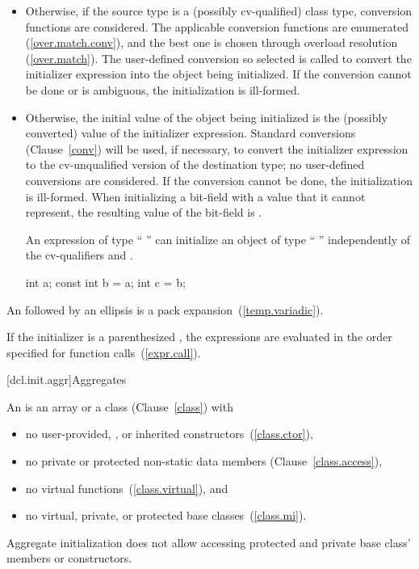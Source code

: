 \begin{itemize}
\item
Otherwise, if the source type
is a (possibly cv-qualified) class type, conversion functions are
considered.
The applicable conversion functions are enumerated
(\ref{over.match.conv}), and the best one is chosen through overload
resolution (\ref{over.match}).
The user-defined conversion so selected
is called to convert the initializer expression into the
object being initialized.
If the conversion cannot be done or is
ambiguous, the initialization is ill-formed.
\item
Otherwise, the initial value of the object being initialized is
the (possibly converted) value of the initializer expression.
Standard conversions (Clause~\ref{conv}) will be used, if necessary,
to convert the initializer expression to the cv-unqualified version of
the destination type;
no user-defined conversions are considered.
If the conversion cannot
be done, the initialization is ill-formed.
When initializing a bit-field with a value that it cannot represent, the
resulting value of the bit-field is
.
%
\begin{note}
An expression of type
`` ''
can initialize an object of type
`` ''
independently of
the cv-qualifiers
and .

\begin{codeblock}
int a;
const int b = a;
int c = b;
\end{codeblock}
\end{note}
\end{itemize}

\pnum
An  followed by an ellipsis is a
pack expansion~(\ref{temp.variadic}).

\pnum
If the initializer is a parenthesized ,
the expressions are evaluated in the order
specified for function calls~(\ref{expr.call}).

[dcl.init.aggr]{Aggregates}%
%
%
%
%
%
%

\pnum
An  is an array or a class (Clause~\ref{class}) with
\begin{itemize}
\item
no user-provided, , or inherited constructors~(\ref{class.ctor}),
\item
no private or protected non-static data members (Clause~\ref{class.access}),
\item
no virtual functions~(\ref{class.virtual}), and
\item
no virtual, private, or protected base classes~(\ref{class.mi}).
\end{itemize}
\begin{note}
Aggregate initialization does not allow accessing
protected and private base class' members or constructors.
\end{note}

